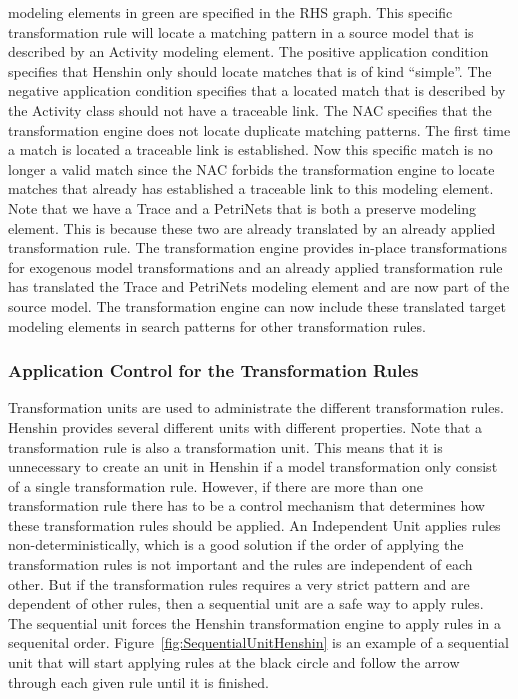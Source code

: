 modeling elements in green are specified in the RHS graph. This specific
transformation rule will locate a matching pattern in a source model that is
described by an Activity modeling element. The positive application condition
specifies that Henshin only should locate matches that is of kind ``simple''.
The negative application condition specifies that a located match that is
described by the Activity class should not have a traceable link.
The NAC specifies that the transformation engine does not locate duplicate
matching patterns. The first time a match is located a traceable link is
established. Now this specific match is no longer a valid match since the NAC
forbids the transformation engine to locate matches that already has
established a traceable link to this modeling element. Note that we have a
Trace and a PetriNets that is both a preserve modeling element. This is because
these two are already translated by an already applied transformation rule. The
transformation engine provides in-place transformations for exogenous model
transformations and an already applied transformation rule has translated the
Trace and PetriNets modeling element and are now part of the source model. The
transformation engine can now include these translated target modeling elements
in search patterns for other transformation rules. 

\subsubsection*{Application Control for the Transformation Rules}
Transformation units are used to administrate the different transformation
rules. Henshin provides several different units with different properties.
Note that a transformation rule is also a transformation unit. This means that
it is unnecessary to create an unit in Henshin if a model transformation only
consist of a single transformation rule. However, if there are more than one 
transformation rule there has to be a control mechanism that determines how
these transformation rules should be applied. An Independent Unit applies
rules non-deterministically, which is a good solution if the order of applying
the transformation rules is not important and the rules are independent of each
other. But if the transformation rules requires a very strict pattern and are
dependent of other rules, then a sequential unit are a safe way to apply rules.
The sequential unit forces the Henshin transformation engine to apply rules in
a sequenital order. Figure~\ref{fig:SequentialUnitHenshin} is an example of a
sequential unit that will start applying rules at the black circle and follow
the arrow through each given rule until it is finished.  


